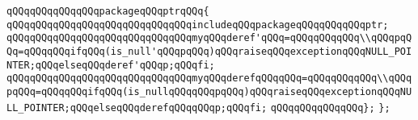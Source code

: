 \verb|qQQqqQQqqQQqqQQqpackageqQQqptrqQQq{|\newline
\verb|qQQqqQQqqQQqqQQqqQQqqQQqqQQqqQQqincludeqQQqpackageqQQqqQQqqQQqptr;|\newline
\verb|qQQqqQQqqQQqqQQqqQQqqQQqqQQqqQQqmyqQQqderef'qQQq=qQQqqQQqqQQq\\qQQqpqQQq=qQQqqQQqifqQQq(is_null'qQQqpqQQq)qQQqraiseqQQqexceptionqQQqNULL_POINTER;qQQqelseqQQqderef'qQQqp;qQQqfi;|\newline
\verb|qQQqqQQqqQQqqQQqqQQqqQQqqQQqqQQqmyqQQqderefqQQqqQQq=qQQqqQQqqQQq\\qQQqpqQQq=qQQqqQQqifqQQq(is_nullqQQqqQQqpqQQq)qQQqraiseqQQqexceptionqQQqNULL_POINTER;qQQqelseqQQqderefqQQqqQQqp;qQQqfi;|\newline
\verb|qQQqqQQqqQQqqQQq};|\newline
\verb|};|\newline

